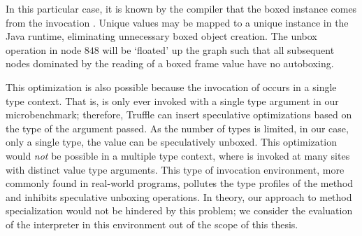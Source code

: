 In this particular case, it is known by the compiler that the boxed instance comes from the invocation .
Unique  values may be mapped to a unique  instance in the Java runtime, eliminating unnecessary boxed object creation.
The unbox operation in node $848$ will be `floated' up the graph such that all subsequent nodes dominated by the reading of a boxed frame value have no autoboxing.

This optimization is also possible because the invocation of  occurs in a single type context.
That is,  is only ever invoked with a single type argument in our microbenchmark; therefore, Truffle can insert speculative optimizations based on the type of the argument passed.
As the number of types is limited, in our case, only a single type, the value can be speculatively unboxed.
This optimization would \textit{not} be possible in a multiple type context, where  is invoked at many sites with distinct value type arguments.
This type of invocation environment, more commonly found in real-world programs, pollutes the type profiles of the method and inhibits speculative unboxing operations.
In theory, our approach to method specialization would not be hindered by this problem; we consider the evaluation of the interpreter in this environment out of the scope of this thesis.


